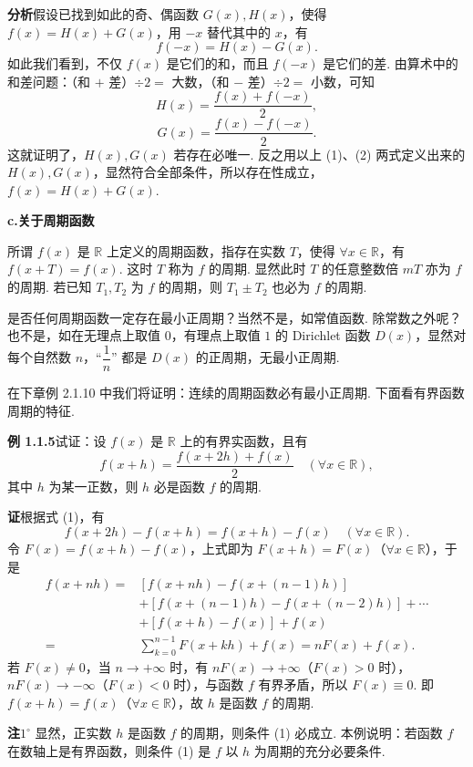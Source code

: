 \documentclass[UTF8,12pt,a4paper,fontset=fandol]{ctexart}
\begin{document}
\noindent\textbf{分析}\quad 假设已找到如此的奇、偶函数 $G(x),H(x)$，使得 $f(x)=H(x)+G(x)$，用 $-x$ 替代其中的 $x$，有
\[
  f(-x)=H(x)-G(x).
\]
如此我们看到，不仅 $f(x)$ 是它们的和，而且 $f(-x)$ 是它们的差. 由算术中的和差问题：（和 $+$ 差）$\div 2=$ 大数，（和 $-$ 差）$\div 2=$ 小数，可知
\[
  H(x)=\frac{f(x)+f(-x)}2,
\tag{1}
\]
\[
  G(x)=\frac{f(x)-f(-x)}2.
\tag{2}
\]
这就证明了，$H(x),G(x)$ 若存在必唯一. 反之用以上 (1)、(2) 两式定义出来的 $H(x),G(x)$，显然符合全部条件，所以存在性成立，$f(x)=H(x)+G(x)$.

\noindent\textbf{c.\quad 关于周期函数}

所谓 $f(x)$ 是 $\mathbb{R}$ 上定义的周期函数，指存在实数 $T$，使得 $\forall x\in\mathbb{R}$，有 $f(x+T)=f(x)$. 这时 $T$ 称为 $f$ 的周期. 显然此时 $T$ 的任意整数倍 $mT$ 亦为 $f$ 的周期. 若已知 $T_1,T_2$ 为 $f$ 的周期，则 $T_1\pm T_2$ 也必为 $f$ 的周期.

是否任何周期函数一定存在最小正周期？当然不是，如常值函数. 除常数之外呢？也不是，如在无理点上取值 $0$，有理点上取值 $1$ 的 Dirichlet 函数 $D(x)$，显然对每个自然数 $n$，“$\dfrac1n$” 都是 $D(x)$ 的正周期，无最小正周期.

在下章例 2.1.10 中我们将证明：连续的周期函数必有最小正周期. 下面看有界函数周期的特征.

\noindent\textbf{例 1.1.5}\quad 试证：设 $f(x)$ 是 $\mathbb{R}$ 上的有界实函数，且有
\[
  f(x+h)=\frac{f(x+2h)+f(x)}2\quad(\forall x\in\mathbb{R}),
\tag{1}
\]
其中 $h$ 为某一正数，则 $h$ 必是函数 $f$ 的周期.

\noindent\textbf{证}\quad 根据式 (1)，有
\[
  f(x+2h)-f(x+h)=f(x+h)-f(x)\quad(\forall x\in\mathbb{R}).
\]
令 $F(x)=f(x+h)-f(x)$，上式即为 $F(x+h)=F(x)$（$\forall x\in\mathbb{R}$），于是
\[
\begin{aligned}
f(x+nh)
={}&[f(x+nh)-f(x+(n-1)h)]\\
&+[f(x+(n-1)h)-f(x+(n-2)h)]+\cdots\\
&+[f(x+h)-f(x)]+f(x)\\
={}&\sum_{k=0}^{n-1}F(x+kh)+f(x)=nF(x)+f(x).
\end{aligned}
\]
若 $F(x)\ne0$，当 $n\to+\infty$ 时，有 $nF(x)\to+\infty$（$F(x)>0$ 时），$nF(x)\to-\infty$（$F(x)<0$ 时），与函数 $f$ 有界矛盾，所以 $F(x)\equiv0$. 即 $f(x+h)=f(x)$（$\forall x\in\mathbb{R}$），故 $h$ 是函数 $f$ 的周期.

\noindent\textbf{注}\quad $1^\circ$ 显然，正实数 $h$ 是函数 $f$ 的周期，则条件 (1) 必成立. 本例说明：若函数 $f$ 在数轴上是有界函数，则条件 (1) 是 $f$ 以 $h$ 为周期的充分必要条件.
\end{document}
